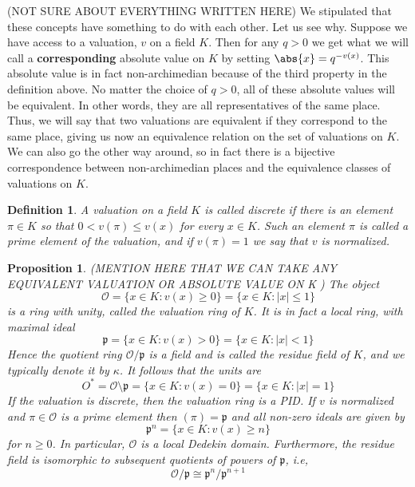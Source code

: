 \documentclass{article}
\newtheorem{definition}{Definition}[section]
\newtheorem{proposition}{Proposition}[section]
\newcommand{\mfrak}[1]{\mathfrak{#1}}
\newcommand{\mcal}[1]{\mathcal{#1}}
\begin{document}
(NOT SURE ABOUT EVERYTHING WRITTEN HERE)
We stipulated that these concepts have something to do with each other. Let us see why. Suppose we have access to a valuation, $v$ on a field $K$. Then for any $q > 0$ we get what we will call a \textbf{corresponding} absolute value on $K$ by setting $\abs{x} = q^{-v(x)}$. This absolute value is in fact non-archimedian because of the third property in the definition above. No matter the choice of $q > 0$, all of these absolute values will be equivalent. In other words, they are all representatives of the same place. Thus, we will say that two valuations are equivalent if they correspond to the same place, giving us now an equivalence relation on the set of valuations on $K$. We can also go the other way around, so in fact there is a bijective correspondence between non-archimedian places and the equivalence classes of valuations on $K$.

\begin{definition}
    A valuation on a field $K$ is called discrete if there is an element $\pi \in K$ so that $0 < v(\pi) \leq v(x)$ for every $x \in K$. Such an element $\pi$ is called a prime element of the valuation, and if $v(\pi) = 1$ we say that $v$ is normalized. 
\end{definition}

\begin{proposition}
    (MENTION HERE THAT WE CAN TAKE ANY EQUIVALENT VALUATION OR ABSOLUTE VALUE ON K  )
    The object
    $$\mcal O = \{x \in K :  v(x) \geq 0 \} = \{x \in K : |x| \leq 1 \}$$ 
    is a ring with unity, called the valuation ring of $K$. It is in fact a local ring, with maximal ideal 
    $$\mfrak p = \{x \in K : v(x) > 0 \} = \{x \in K : |x| < 1 \}$$
    Hence the quotient ring $\mcal O / \mfrak p$ is a field and is called the residue field of $K$, and we typically denote it by $\kappa$. It follows that the units are 
    $$O^* = \mcal O \setminus \mfrak p = \{x \in K : v(x) = 0 \} = \{x \in K : |x| = 1 \}$$
    If the valuation is discrete, then the valuation ring is a PID. If $v$ is normalized and $\pi \in \mcal O$ is a prime element then $(\pi) = \mfrak{p}$ and all non-zero ideals are given by
    $$\mfrak p^n = \{x \in K : v(x) \geq n \}$$
    for $n \geq 0$. In particular, $\mcal O$ is a local Dedekin domain. Furthermore, the residue field is isomorphic to subsequent quotients of powers of $\mfrak p$, i.e,
    $$\mcal O / \mfrak p \cong \mfrak p^n / \mfrak p^{n+1}$$
\end{proposition}
\end{document}
